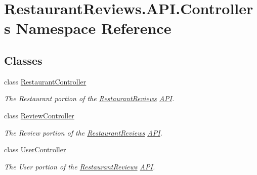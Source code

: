 \hypertarget{namespace_restaurant_reviews_1_1_a_p_i_1_1_controllers}{}\section{Restaurant\+Reviews.\+A\+P\+I.\+Controllers Namespace Reference}
\label{namespace_restaurant_reviews_1_1_a_p_i_1_1_controllers}
\subsection*{Classes}
\begin{DoxyCompactItemize}
\item 
class \hyperlink{class_restaurant_reviews_1_1_a_p_i_1_1_controllers_1_1_restaurant_controller}{Restaurant\+Controller}
\begin{DoxyCompactList}\small\item\em The Restaurant portion of the \hyperlink{namespace_restaurant_reviews}{Restaurant\+Reviews} \hyperlink{namespace_restaurant_reviews_1_1_a_p_i}{A\+PI}. \end{DoxyCompactList}\item 
class \hyperlink{class_restaurant_reviews_1_1_a_p_i_1_1_controllers_1_1_review_controller}{Review\+Controller}
\begin{DoxyCompactList}\small\item\em The Review portion of the \hyperlink{namespace_restaurant_reviews}{Restaurant\+Reviews} \hyperlink{namespace_restaurant_reviews_1_1_a_p_i}{A\+PI}. \end{DoxyCompactList}\item 
class \hyperlink{class_restaurant_reviews_1_1_a_p_i_1_1_controllers_1_1_user_controller}{User\+Controller}
\begin{DoxyCompactList}\small\item\em The User portion of the \hyperlink{namespace_restaurant_reviews}{Restaurant\+Reviews} \hyperlink{namespace_restaurant_reviews_1_1_a_p_i}{A\+PI}. \end{DoxyCompactList}\end{DoxyCompactItemize}
